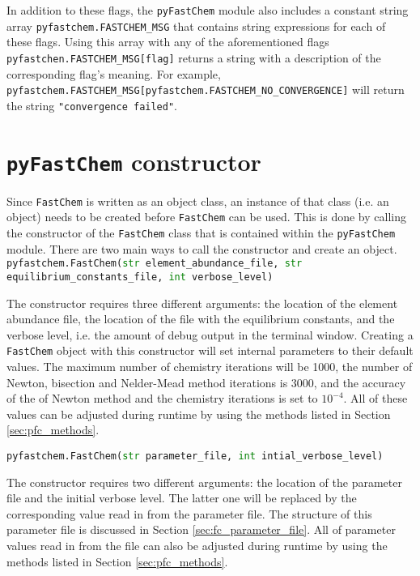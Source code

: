 \documentclass[numbers=noenddot]{aux/fcmanual}
\newcommand{\fc}{\texttt{FastChem}\xspace}
\newcommand{\pfc}{\texttt{pyFastChem}\xspace}
\begin{document}
\bigbreak
          
In addition to these flags, the \pfc module also includes a constant string array \lstinline!pyfastchem.FASTCHEM_MSG! that contains string expressions for each of these flags. Using this array with any of the aforementioned flags \lstinline!pyfastchen.FASTCHEM_MSG[flag]! returns a string with a description of the corresponding flag's meaning. For example, \lstinline!pyfastchem.FASTCHEM_MSG[pyfastchem.FASTCHEM_NO_CONVERGENCE]! will return the string \lstinline!"convergence failed"!.


\section{\pfc constructor}

Since \fc is written as an object class, an instance of that class (i.e. an object) needs to be created before \fc can be used. This is done by calling the constructor of the \fc class that is contained within the \pfc module. There are two main ways to call the constructor and create an object.\\


\lstinline[language=Python, breaklines=true]!pyfastchem.FastChem(str element_abundance_file, str equilibrium_constants_file, int verbose_level)!
\begin{addmargin}[25pt]{0pt}
	The constructor requires three different arguments: the location of the element abundance file, the location of the file with the equilibrium constants, and the verbose level, i.e. the amount of debug output in the terminal window. Creating a \fc object with this constructor will set internal parameters to their default values. The maximum number of chemistry iterations will be 1000, the number of Newton, bisection and Nelder-Mead method iterations is 3000, and the accuracy of the of Newton method and the chemistry iterations is set to $10^{-4}$. All of these values can be adjusted during runtime by using the methods listed in Section \ref{sec:pfc_methods}.
\end{addmargin}

\bigbreak

\lstinline[language=Python]!pyfastchem.FastChem(str parameter_file, int intial_verbose_level)!
\begin{addmargin}[25pt]{0pt}
	The constructor requires two different arguments: the location of the parameter file and the initial verbose level. The latter one will be replaced by the corresponding value read in from the parameter file. The structure of this parameter file is discussed in Section \ref{sec:fc_parameter_file}. All of parameter values read in from the file can also be adjusted during runtime by using the methods listed in Section \ref{sec:pfc_methods}.
\end{addmargin}
\end{document}
